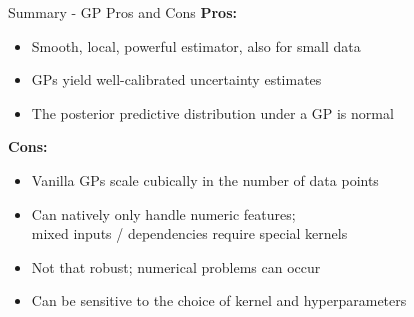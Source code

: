 \documentclass[main]{subfiles}
\begin{document}
\begin{frame}{Summary - GP Pros and Cons}
    \textbf{Pros:}
    \begin{itemize}
        \item Smooth, local, powerful estimator, also for small data
        \item GPs yield well-calibrated uncertainty estimates
        \item The posterior predictive distribution under a GP is normal
    \end{itemize}
    \textbf{Cons:}
    \begin{itemize}
        \item Vanilla GPs scale cubically in the number of data points
        \item Can natively only handle numeric features;\\
        mixed inputs / dependencies require special kernels
        \item Not that robust; numerical problems can occur
        \item Can be sensitive to the choice of kernel and hyperparameters
    \end{itemize}
\end{frame}
\end{document}
